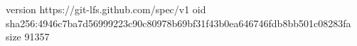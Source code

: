 version https://git-lfs.github.com/spec/v1
oid sha256:4946c7ba7d56999223c90c80978b69bf31f43b0ea646746fdb8bb501c08283fa
size 91357
